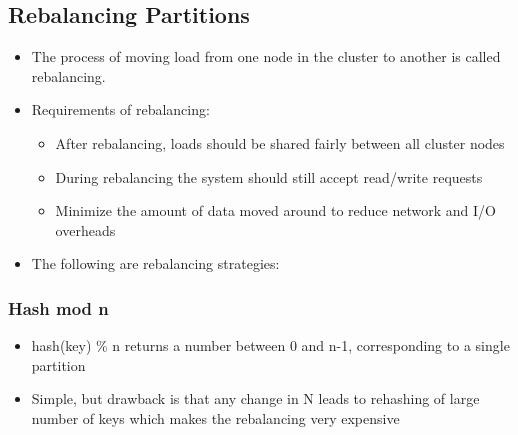 \documentclass{article}
\begin{document}
\subsection{Rebalancing Partitions}
\begin{itemize}
    \item The process of moving load from one node in the cluster to another is called rebalancing.
    
    \item Requirements of rebalancing:
    \begin{itemize}
        \item After rebalancing, loads should be shared fairly between all cluster nodes 
        
        \item During rebalancing the system should still accept read/write requests
        
        \item Minimize the amount of data moved around to reduce network and I/O overheads

    \end{itemize}
    
    \item The following are rebalancing strategies:
\end{itemize}

\subsubsection{Hash mod n}
\begin{itemize}
    \item hash(key) \% n returns a number between 0 and n-1, corresponding to a single partition
    
    \item Simple, but drawback is that any change in N leads to rehashing of large number of keys which makes the rebalancing very expensive
\end{itemize}
\end{document}
